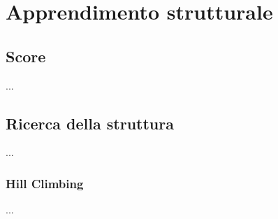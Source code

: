 
\chapter{Apprendimento strutturale}
\label{cap:ctbn-structural-learning}
\lipsum[1]

\section{Score}
\label{sec:ctbn-score}
...

\section{Ricerca della struttura}
\label{sec:ctbn-graph-search}
...

\subsection{Hill Climbing}
\label{sec:hc}
...
